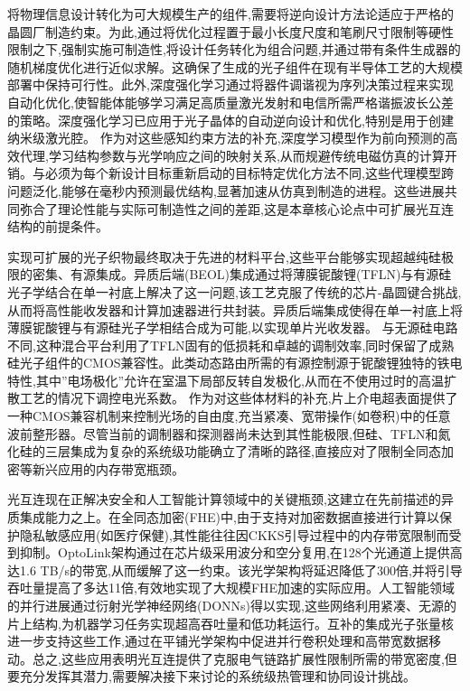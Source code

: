 \documentclass[11pt]{article}
\begin{document}
将物理信息设计转化为可大规模生产的组件,需要将逆向设计方法论适应于严格的晶圆厂制造约束。为此,通过将优化过程置于最小长度尺度和笔刷尺寸限制等硬性限制之下,强制实施可制造性,将设计任务转化为组合问题,并通过带有条件生成器的随机梯度优化进行近似求解。这确保了生成的光子组件在现有半导体工艺的大规模部署中保持可行性。此外,深度强化学习通过将器件调谐视为序列决策过程来实现自动化优化,使智能体能够学习满足高质量激光发射和电信所需严格谐振波长公差的策略。深度强化学习已应用于光子晶体的自动逆向设计和优化,特别是用于创建纳米级激光腔。\citep{doi_10_1515_nanoph_2022_0692_4b166807} 作为对这些感知约束方法的补充,深度学习模型作为前向预测的高效代理,学习结构参数与光学响应之间的映射关系,从而规避传统电磁仿真的计算开销。与必须为每个新设计目标重新启动的目标特定优化方法不同,这些代理模型跨问题泛化,能够在毫秒内预测最优结构,显著加速从仿真到制造的进程。这些进展共同弥合了理论性能与实际可制造性之间的差距,这是本章核心论点中可扩展光互连结构的前提条件。\citep{doi_10_1021_acsphotonics_2c00313_0d7d39c3} \citep{doi_10_1515_nanoph_2022_0692_4b166807} \citep{doi_10_29026_oes_2022_210012_27973a69} \citep{doi_10_1109_jphot_2022_3182050_3cfb78ba}

实现可扩展的光子织物最终取决于先进的材料平台,这些平台能够实现超越纯硅极限的密集、有源集成。异质后端(BEOL)集成通过将薄膜铌酸锂(TFLN)与有源硅光子学结合在单一衬底上解决了这一问题,该工艺克服了传统的芯片-晶圆键合挑战,从而将高性能收发器和计算加速器进行共封装。异质后端集成使得在单一衬底上将薄膜铌酸锂与有源硅光子学相结合成为可能,以实现单片光收发器。\citep{s2_9b444e84d20ae6e3d62d2d4df30268b5a53baad2_40af2cc9} 与无源硅电路不同,这种混合平台利用了TFLN固有的低损耗和卓越的调制效率,同时保留了成熟硅光子组件的CMOS兼容性。此类动态路由所需的有源控制源于铌酸锂独特的铁电特性,其中''电场极化''允许在室温下局部反转自发极化,从而在不使用过时的高温扩散工艺的情况下调控电光系数。\citep{s2_a1b7de5981aa9a6aa9f9bd0c4422d9b023fc454f_bec494c5} \citep{doi_10_1117_12_2654937_d0b4bc2b} 作为对这些体材料的补充,片上介电超表面提供了一种CMOS兼容机制来控制光场的自由度,充当紧凑、宽带操作(如卷积)中的任意波前整形器。尽管当前的调制器和探测器尚未达到其性能极限,但硅、TFLN和氮化硅的三层集成为复杂的系统级功能确立了清晰的路径,直接应对了限制全同态加密等新兴应用的内存带宽瓶颈。\citep{s2_9b444e84d20ae6e3d62d2d4df30268b5a53baad2_40af2cc9} \citep{doi_10_1126_science_abj4396_40f36a09} \citep{doi_10_1515_nanoph_2022_0294_1bd118d5} \citep{doi_10_1145_3806395_315ab915}

光互连现在正解决安全和人工智能计算领域中的关键瓶颈,这建立在先前描述的异质集成能力之上。在全同态加密(FHE)中,由于支持对加密数据直接进行计算以保护隐私敏感应用(如医疗保健),其性能往往因CKKS引导过程中的内存带宽限制而受到抑制。OptoLink架构通过在芯片级采用波分和空分复用,在128个光通道上提供高达1.6 TB/s的带宽,从而缓解了这一约束。该光学架构将延迟降低了300倍,并将引导吞吐量提高了多达11倍,有效地实现了大规模FHE加速的实际应用。人工智能领域的并行进展通过衍射光学神经网络(DONNs)得以实现,这些网络利用紧凑、无源的片上结构,为机器学习任务实现超高吞吐量和低功耗运行。互补的集成光子张量核进一步支持这些工作,通过在平铺光学架构中促进并行卷积处理和高带宽数据移动。总之,这些应用表明光互连提供了克服电气链路扩展性限制所需的带宽密度,但要充分发挥其潜力,需要解决接下来讨论的系统级热管理和协同设计挑战。\citep{doi_10_1145_3806395_315ab915} \citep{doi_10_1002_nap2_70098_8d5f2f8a} \citep{doi_10_1515_nanoph_2022_0423_38a2c3ec}
\end{document}
